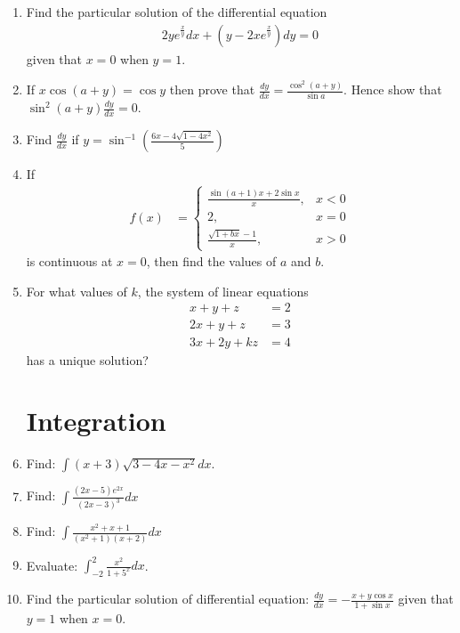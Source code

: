 \documentclass[10pt,-letter paper]{article}
\providecommand{\brak}[1]{\ensuremath{\left(#1\right)}}
\begin{document}
\begin{enumerate}
\item Find the particular solution of the differential equation
\begin{align*}
2ye^{\frac{x}{y}}dx + \brak{y - 2xe^{\frac{x}{y}}}dy = 0
\end{align*}
given that $x=0$ when $y=1$.

\item If $x\cos(a+y) = \cos{y}$ then prove that $\frac{dy}{dx} = \frac{\cos^2(a+y)}{\sin{a}}$. Hence show that $\sin^2(a+y)\frac{dy}{dx} = 0$.

\item Find $\frac{dy}{dx}$ if $y = \sin^{-1}\brak{\frac{6x - 4\sqrt{1-4x^2}}{5}}$

\item If \begin{align*}f(x) &= \begin{cases}\frac{\sin(a+1)x + 2\sin x}{x}, &x<0\\ 2, &x=0 \\ \frac{\sqrt{1+bx}-1}{x}, &x>0 \end{cases}\end{align*} is continuous at $x=0$, then find the values of $a$ and $b$.

\item For what values of $k$, the system of linear equations
\begin{align*}
x+y+z &= 2\\
2x+y+z &= 3\\
3x+2y+kz &= 4
\end{align*}
has a unique solution?

\section{Integration}

\item Find: $\int{\brak{x+3}\sqrt{3 - 4x - x^2}dx}$.

\item Find: $\int{\frac{(2x - 5)e^{2x}}{(2x-3)^3}dx}$

\item Find: $\int{\frac{x^2+x+1}{(x^2+1)(x+2)}dx}$

\item Evaluate: $\int_{-2}^{2}\frac{x^2}{1+5^x}dx$.

\item Find the particular solution of differential equation: $\frac{dy}{dx} = -\frac{x+y\cos{x}}{1+\sin{x}}$ given that $y = 1$ when $x=0$.


\end{enumerate}
\end{document}
